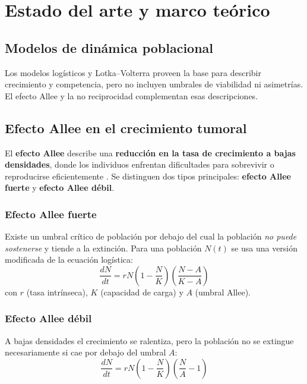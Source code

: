\chapter{Estado del arte y marco teórico}

\section{Modelos de dinámica poblacional}
Los modelos logísticos y Lotka--Volterra proveen la base para describir crecimiento y competencia, pero no incluyen umbrales de viabilidad ni asimetrías. El efecto Allee y la no reciprocidad complementan esas descripciones.

\section{Efecto Allee en el crecimiento tumoral}
El \textbf{efecto Allee} describe una \textbf{reducción en la tasa de crecimiento a bajas densidades}, donde los individuos enfrentan dificultades para sobrevivir o reproducirse eficientemente \cite{murray_mathematical_2002}. Se distinguen dos tipos principales: \textbf{efecto Allee fuerte} y \textbf{efecto Allee débil}.

\subsection{Efecto Allee fuerte}
Existe un umbral crítico de población por debajo del cual la población \textit{no puede sostenerse} y tiende a la extinción. Para una población $N(t)$ se usa una versión modificada de la ecuación logística:
\begin{equation}
\frac{dN}{dt} = rN \left(1 - \frac{N}{K}\right) \left(\frac{N - A}{K - A}\right)
\label{eq:strong_allee}
\end{equation}
con $r$ (tasa intrínseca), $K$ (capacidad de carga) y $A$ (umbral Allee).

\subsection{Efecto Allee débil}
A bajas densidades el crecimiento se ralentiza, pero la población no se extingue necesariamente si cae por debajo del umbral $A$:
\begin{equation}
\frac{dN}{dt} = rN \left(1 - \frac{N}{K}\right) \left(\frac{N}{A} - 1\right)
\label{eq:weak_allee}
\end{equation}

